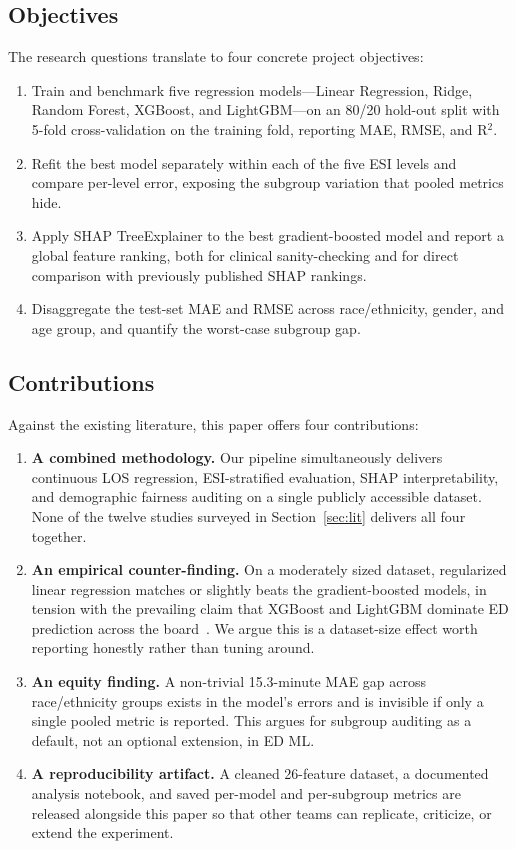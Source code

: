 \documentclass[conference]{IEEEtran}
\begin{document}
\subsection{Objectives}
The research questions translate to four concrete project objectives:
\begin{enumerate}
    \item Train and benchmark five regression models---Linear Regression,
    Ridge, Random Forest, XGBoost, and LightGBM---on an 80/20 hold-out split
    with 5-fold cross-validation on the training fold, reporting MAE, RMSE,
    and R$^2$.
    \item Refit the best model separately within each of the five ESI levels
    and compare per-level error, exposing the subgroup variation that pooled
    metrics hide.
    \item Apply SHAP TreeExplainer to the best gradient-boosted model and
    report a global feature ranking, both for clinical sanity-checking and
    for direct comparison with previously published SHAP rankings.
    \item Disaggregate the test-set MAE and RMSE across race/ethnicity,
    gender, and age group, and quantify the worst-case subgroup gap.
\end{enumerate}

\subsection{Contributions}
Against the existing literature, this paper offers four contributions:
\begin{enumerate}
    \item \textbf{A combined methodology.} Our pipeline simultaneously
    delivers continuous LOS regression, ESI-stratified evaluation, SHAP
    interpretability, and demographic fairness auditing on a single
    publicly accessible dataset. None of the twelve studies surveyed in
    Section~\ref{sec:lit} delivers all four together.
    \item \textbf{An empirical counter-finding.} On a moderately sized
    dataset, regularized linear regression matches or slightly beats the
    gradient-boosted models, in tension with the prevailing claim that
    XGBoost and LightGBM dominate ED prediction across the
    board~\cite{wu2025, ricciardi2024}. We argue this is a dataset-size
    effect worth reporting honestly rather than tuning around.
    \item \textbf{An equity finding.} A non-trivial 15.3-minute MAE gap
    across race/ethnicity groups exists in the model's errors and is
    invisible if only a single pooled metric is reported. This argues for
    subgroup auditing as a default, not an optional extension, in ED ML.
    \item \textbf{A reproducibility artifact.} A cleaned 26-feature dataset,
    a documented analysis notebook, and saved per-model and per-subgroup
    metrics are released alongside this paper so that other teams can
    replicate, criticize, or extend the experiment.
\end{enumerate}
\end{document}
